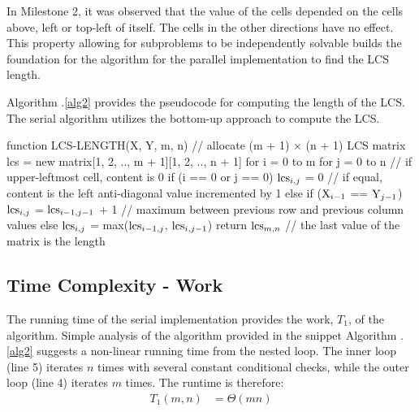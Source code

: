 \documentclass[usletter, 11pt]{extarticle}
\newcommand{\V}[1]{\textup{#1}}
\newcommand{\lcs}{\V{lcs}}
\newcommand{\seqone}{\V{X}}
\newcommand{\seqtwo}{\V{Y}}
\begin{document}
    \vspace{-0.5in}
    In Milestone 2, it was observed that the value of the cells depended on the
    cells above, left or top-left of itself. The cells in the other directions
    have no effect. This property allowing for subproblems to be independently
    solvable builds the foundation for the algorithm for the parallel
    implementation to find the LCS length.

    Algorithm \thesection .\ref{alg2} provides the pseudocode for
    computing the length of the LCS. The serial algorithm utilizes the bottom-up approach to compute the LCS.

\newpage
\begin{pseudocode}[caption={Serial Longest Common Subsequence Length},
label={alg2}]
function LCS-LENGTH(X, Y, m, n)
    // allocate (m + 1) $\times$ (n + 1) LCS matrix
    lcs = new matrix[1, 2, .., m + 1][1, 2, .., n + 1]
    for i = 0 to m
        for j = 0 to n
            // if upper-leftmost cell, content is 0
            if (i == 0 or j == 0)
                $\lcs_{i, j}$ = 0
            // if equal, content is the left anti-diagonal value incremented by 1
            else if ($\seqone_{i - 1}$ == $\seqtwo_{j - 1}$)
                $\lcs_{i, j}$ = $\lcs_{i-1, j-1}$ + 1  
            // maximum between previous row and previous column values
            else
                $\lcs_{i, j}$ = max($\lcs_{i-1, j}$, $\lcs_{i, j-1}$)
    return $\lcs_{m,n}$  // the last value of the matrix is the length

\end{pseudocode}

        \subsection{Time Complexity - Work} The running time of the serial
        implementation provides the work, $T_{1}$, of the algorithm. Simple
        analysis of the algorithm provided in the snippet Algorithm \thesection
        .\ref{alg2} suggests a non-linear running time from the nested loop.
        The inner loop (line 5) iterates $n$ times with several constant
        conditional checks, while the outer loop (line 4) iterates $m$ times.
        The runtime is therefore:
        \begin{equation*}
            \begin{split}
                T_1(m, n) & = \Theta(mn) \\
            \end{split}
        \end{equation*}
\end{document}
